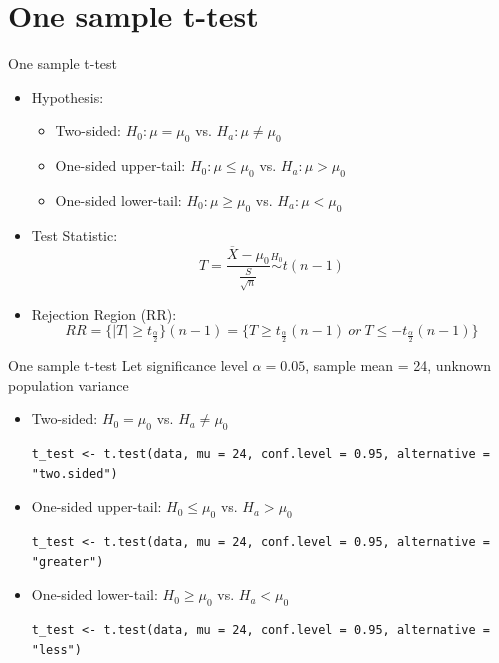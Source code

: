 \documentclass[aspectratio=169]{beamer}
\begin{document}
\section{One sample t-test}
\begin{frame}{One sample t-test}
\begin{itemize}
    \item Hypothesis: 
    \begin{itemize}
        \item Two-sided: $H_0: \mu = \mu_0$ vs. $H_a: \mu \neq \mu_0$ 
        \item One-sided upper-tail: $H_0: \mu \leq \mu_0$ vs. $H_a: \mu > \mu_0$
        \item One-sided lower-tail: $H_0: \mu \geq \mu_0$ vs. $H_a: \mu < \mu_0$
    \end{itemize}
    \item Test Statistic:
    \[
    T = \frac{\overline{X}-\mu_0}{\frac{S}{\sqrt{n}}} \overset{H_0}{\sim} t(n-1)
    \]
    \item Rejection Region (RR):
    \[
    RR = \{\lvert T \rvert \ge t_{\frac{\alpha}{2}}\}(n-1) = \{T \ge t_{\frac{\alpha}{2}}(n-1)\ or\ T \le -t_{\frac{\alpha}{2}}(n-1)\}
    \]
\end{itemize}
\end{frame}

\begin{frame}[fragile]{One sample t-test}
Let significance level $\alpha = 0.05$, sample mean = 24, unknown population variance
\begin{itemize}
    \item Two-sided: $H_0 = \mu_0$ vs. $H_a\neq \mu_0$ 
\begin{lstlisting}
t_test <- t.test(data, mu = 24, conf.level = 0.95, alternative = "two.sided")
\end{lstlisting}
    \item One-sided upper-tail: $H_0 \leq \mu_0$ vs. $H_a > \mu_0$
\begin{lstlisting}
t_test <- t.test(data, mu = 24, conf.level = 0.95, alternative = "greater")
\end{lstlisting}
    \item One-sided lower-tail: $H_0 \ge \mu_0$ vs. $H_a < \mu_0$
\begin{lstlisting}
t_test <- t.test(data, mu = 24, conf.level = 0.95, alternative = "less")
\end{lstlisting}
\end{itemize}
\end{frame}
\end{document}
